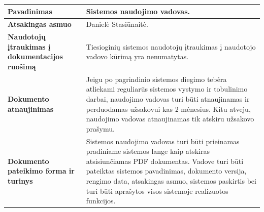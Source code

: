 \documentclass[12pt]{article}
\begin{document}
\begin{table}[htb!]
    \captionsetup{justification=centering}
    \begin{tabular}{|m{6cm}|m{10cm}|}
        \hline
        \raggedleft \textbf{\cellcolor{deepchampagne}Pavadinimas} &
        Sistemos naudojimo vadovas. \\
        \hline
        \raggedleft \textbf{\cellcolor{deepchampagne}Atsakingas asmuo} &
        Danielė Stasiūnaitė. \\
        \hline
        \raggedleft \textbf{\cellcolor{deepchampagne}Naudotojų įtraukimas į
        dokumentacijos ruošimą} & 
        Tiesioginių sistemos naudotojų įtraukimas į naudotojo vadovo kūrimą yra
        nenumatytas. \\
        \hline
        \raggedleft \textbf{\cellcolor{deepchampagne}Dokumento atnaujinimas} &
        Jeigu po pagrindinio sistemos diegimo tebėra atliekami reguliarūs
        sistemos vystymo ir tobulinimo darbai, naudojimo vadovas turi būti
        atnaujinamas ir perduodamas užsakovui kas 2 mėnesius. Kitu atveju,
        naudojimo vadovas atnaujinamas tik atskiru užsakovo prašymu. \\
        \hline
        \raggedleft \textbf{\cellcolor{deepchampagne}Dokumento pateikimo forma
        ir turinys} &
        Sistemos naudojimo vadovas turi būti prieinamas pradiniame sistemos
        lange kaip atskiras atsisiunčiamas PDF dokumentas. Vadove turi būti
        pateiktas sistemos pavadinimas, dokumento versija, rengimo data,
        atsakingas asmuo, sistemos paskirtis bei turi būti aprašytos visos
        sistemoje realizuotos funkcijos. \\
        \hline
    \end{tabular}
\end{table}




\end{document}
